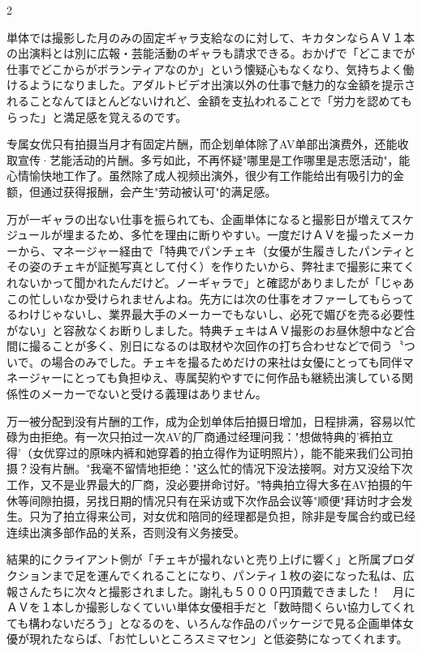 \documentclass[12pt,UTF8]{ctexbook}
\begin{document}
\begin{paracol}{2}
\switchcolumn*

単体では撮影した月のみの固定ギャラ支給なのに対して、キカタンならＡＶ１本の出演料とは別に広報・芸能活動のギャラも請求できる。おかげで「どこまでが仕事でどこからがボランティアなのか」という懐疑心もなくなり、気持ちよく働けるようになりました。アダルトビデオ出演以外の仕事で魅力的な金額を提示されることなんてほとんどないけれど、金額を支払われることで「労力を認めてもらった」と満足感を覚えるのです。

\switchcolumn

专属女优只有拍摄当月才有固定片酬，而企划单体除了AV单部出演费外，还能收取宣传·艺能活动的片酬。多亏如此，不再怀疑"哪里是工作哪里是志愿活动"，能心情愉快地工作了。虽然除了成人视频出演外，很少有工作能给出有吸引力的金额，但通过获得报酬，会产生"劳动被认可"的满足感。

\switchcolumn*

万が一ギャラの出ない仕事を振られても、企画単体になると撮影日が増えてスケジュールが埋まるため、多忙を理由に断りやすい。一度だけＡＶを撮ったメーカーから、マネージャー経由で「特典でパンチェキ（女優が生履きしたパンティとその姿のチェキが証拠写真として付く）を作りたいから、弊社まで撮影に来てくれないかって聞かれたんだけど。ノーギャラで」と確認がありましたが「じゃあこの忙しいなか受けられませんよね。先方には次の仕事をオファーしてもらってるわけじゃないし、業界最大手のメーカーでもないし、必死で媚びを売る必要性がない」と容赦なくお断りしました。特典チェキはＡＶ撮影のお昼休憩中など合間に撮ることが多く、別日になるのは取材や次回作の打ち合わせなどで伺う〝ついで〟の場合のみでした。チェキを撮るためだけの来社は女優にとっても同伴マネージャーにとっても負担ゆえ、専属契約やすでに何作品も継続出演している関係性のメーカーでないと受ける義理はありません。

\switchcolumn

万一被分配到没有片酬的工作，成为企划单体后拍摄日增加，日程排满，容易以忙碌为由拒绝。有一次只拍过一次AV的厂商通过经理问我："想做特典的'裤拍立得'（女优穿过的原味内裤和她穿着的拍立得作为证明照片），能不能来我们公司拍摄？没有片酬。"我毫不留情地拒绝："这么忙的情况下没法接啊。对方又没给下次工作，又不是业界最大的厂商，没必要拼命讨好。"特典拍立得大多在AV拍摄的午休等间隙拍摄，另找日期的情况只有在采访或下次作品会议等"顺便"拜访时才会发生。只为了拍立得来公司，对女优和陪同的经理都是负担，除非是专属合约或已经连续出演多部作品的关系，否则没有义务接受。

\switchcolumn*

結果的にクライアント側が「チェキが撮れないと売り上げに響く」と所属プロダクションまで足を運んでくれることになり、パンティ１枚の姿になった私は、広報さんたちに次々と撮影されました。謝礼も５０００円頂戴できました！　月にＡＶを１本しか撮影しなくていい単体女優相手だと「数時間くらい協力してくれても構わないだろう」となるのを、いろんな作品のパッケージで見る企画単体女優が現れたならば、「お忙しいところスミマセン」と低姿勢になってくれます。


\end{paracol}
\end{document}
